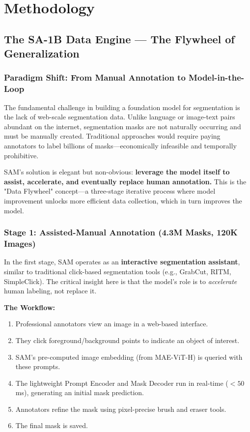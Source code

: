 \chapter{Methodology}
\section{The SA-1B Data Engine --- The Flywheel of Generalization}

\subsection{Paradigm Shift: From Manual Annotation to Model-in-the-Loop}
The fundamental challenge in building a foundation model for segmentation is the lack of web-scale segmentation data. Unlike language or image-text pairs abundant on the internet, segmentation masks are not naturally occurring and must be manually created. Traditional approaches would require paying annotators to label billions of masks—economically infeasible and temporally prohibitive.

SAM's solution is elegant but non-obvious: \textbf{leverage the model itself to assist, accelerate, and eventually replace human annotation.} This is the "Data Flywheel" concept—a three-stage iterative process where model improvement unlocks more efficient data collection, which in turn improves the model.

\subsection{Stage 1: Assisted-Manual Annotation (4.3M Masks, 120K Images)}
In the first stage, SAM operates as an \textbf{interactive segmentation assistant}, similar to traditional click-based segmentation tools (e.g., GrabCut, RITM, SimpleClick). The critical insight here is that the model's role is to \textit{accelerate} human labeling, not replace it.

\textbf{The Workflow:}
\begin{enumerate}
    \item Professional annotators view an image in a web-based interface.
    \item They click foreground/background points to indicate an object of interest.
    \item SAM's pre-computed image embedding (from MAE-ViT-H) is queried with these prompts.
    \item The lightweight Prompt Encoder and Mask Decoder run in real-time ($< 50$ms), generating an initial mask prediction.
    \item Annotators refine the mask using pixel-precise brush and eraser tools.
    \item The final mask is saved.
\end{enumerate}

